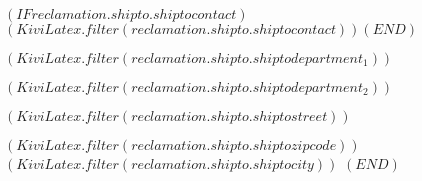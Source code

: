                  $( IF reclamation.shipto.shiptocontact )$ $( KiviLatex.filter(reclamation.shipto.shiptocontact) )$$( END )$

                 $( KiviLatex.filter(reclamation.shipto.shiptodepartment_1) )$

                 $( KiviLatex.filter(reclamation.shipto.shiptodepartment_2) )$

                 $( KiviLatex.filter(reclamation.shipto.shiptostreet) )$

                 $( KiviLatex.filter(reclamation.shipto.shiptozipcode) )$ $( KiviLatex.filter(reclamation.shipto.shiptocity) )$
$( END )$
\vspace*{1.5cm}

\hfill

\\

\vkreklamationsformel\\

\vspace{0.5cm}



